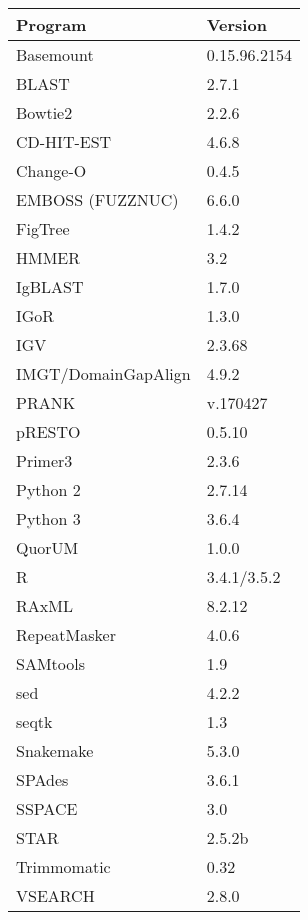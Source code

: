 \begin{tabular}{ll}
  \toprule Program & Version \\ 
  \midrule Basemount & 0.15.96.2154 \\ 
  BLAST & 2.7.1 \\ 
  Bowtie2 & 2.2.6 \\ 
  CD-HIT-EST & 4.6.8 \\ 
  Change-O & 0.4.5 \\ 
  EMBOSS (FUZZNUC) & 6.6.0 \\ 
  FigTree & 1.4.2 \\ 
  HMMER & 3.2 \\ 
  IgBLAST & 1.7.0 \\ 
  IGoR & 1.3.0 \\ 
  IGV & 2.3.68 \\ 
  IMGT/DomainGapAlign & 4.9.2 \\ 
  PRANK & v.170427 \\ 
  pRESTO & 0.5.10 \\ 
  Primer3 & 2.3.6 \\ 
  Python 2 & 2.7.14 \\ 
  Python 3 & 3.6.4 \\ 
  QuorUM & 1.0.0 \\ 
  R & 3.4.1/3.5.2 \\ 
  RAxML & 8.2.12 \\ 
  RepeatMasker & 4.0.6 \\ 
  SAMtools & 1.9 \\ 
  sed & 4.2.2 \\ 
  seqtk & 1.3 \\ 
  Snakemake & 5.3.0 \\ 
  SPAdes & 3.6.1 \\ 
  SSPACE & 3.0 \\ 
  STAR & 2.5.2b \\ 
  Trimmomatic & 0.32 \\ 
  VSEARCH & 2.8.0 \\ 
   \bottomrule \end{tabular}
